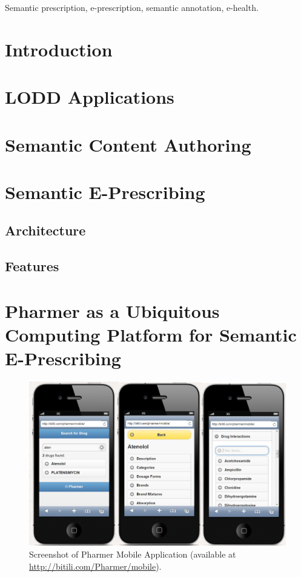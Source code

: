 \documentclass[journal]{IEEEtran}
\begin{document}
\begin{IEEEkeywords}
 Semantic prescription, e-prescription, semantic annotation, e-health.
\end{IEEEkeywords}



\IEEEpeerreviewmaketitle


\section{Introduction}
\label{intro}

\section{LODD Applications}
\label{lod}

\section{Semantic Content Authoring}
\label{sca}


\section{Semantic E-Prescribing}
\label{sep}

\subsection{Architecture}

\subsection{Features}

\section{Pharmer as a Ubiquitous Computing Platform for Semantic E-Prescribing}
\label{mobile}

\begin{figure}[tb]
 \centering
 \includegraphics[width=1.5\columnwidth]{images/sc_Pharmer.png}
	\caption{Screenshot of Pharmer Mobile Application (available at \url{http://bitili.com/Pharmer/mobile}).}
 \label{fig:mobile}
\end{figure}
\end{document}

